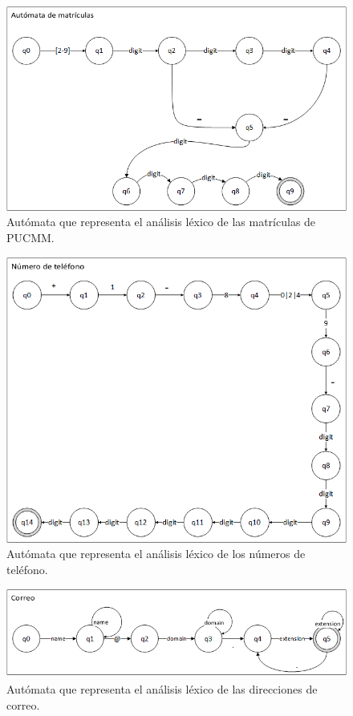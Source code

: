 \documentclass[a4paper,12pt]{article}
\begin{document}
\begin{figure}[h]
  \includegraphics[width=\linewidth]{matricula.png}
  \caption{Autómata que representa el análisis léxico de las matrículas de PUCMM.}
  \label{fig:auto1}
\end{figure}


\begin{figure}[h]
  \includegraphics[width=\linewidth]{telefono.png}
  \caption{Autómata que representa el análisis léxico de los números de teléfono.}
  \label{fig:auto2}
\end{figure}

\begin{figure}[h]
  \includegraphics[width=\linewidth]{correo.png}
  \caption{Autómata que representa el análisis léxico de las direcciones de correo.}
  \label{fig:auto3}
\end{figure}
\end{document}
